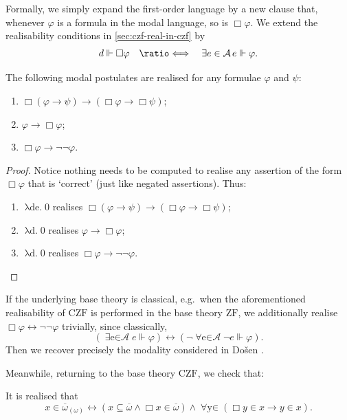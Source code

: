 \documentclass[12pt,openany]{book}
\theoremstyle{plain}
\theoremstyle{definition}
\newcommand\uplabel[1]{\textup{(#1)}}
\newcommand\opA[1]{\mathop{\forall #1}}
\newcommand\opE[1]{\mathop{\exists #1}}
\newcommand\oplam[1]{\mathop{\lambda #1.}}
\newcommand\defeqv{\quad \ratio\Longleftrightarrow \quad}
\newcommand\CZF{\mathrm{CZF}}
\newcommand\ZF{\mathrm{ZF}}
\begin{document}
Formally, we simply expand the first-order language by a new clause that, whenever $\varphi$ is a formula in the modal language, so is $\Box \varphi$. We extend the realisability conditions in \autoref{sec:czf-real-in-czf} by
\[d \Vdash \Box \varphi \defeqv \opE{e \in \mathcal{A}} e \Vdash \varphi.\]

\begin{lemma}
  \label{lem:dn-modal-axioms}
  The following modal postulates are realised for any formulae $\varphi$ and $\psi$:
  \begin{enumerate}[label=\uplabel{\arabic*}]
    \item $\Box \left(\varphi \rightarrow \psi\right) \rightarrow \left(\Box \varphi \rightarrow \Box \psi\right)$;
    \item $\varphi \rightarrow \Box \varphi$;
    \item $\Box \varphi \rightarrow \neg \neg \varphi$.
  \end{enumerate}
\end{lemma}

\begin{proof}
  Notice nothing needs to be computed to realise any assertion of the form $\Box \varphi$ that is `correct' (just like negated assertions). Thus:
  \begin{enumerate}[label=\uplabel{\arabic*}]
    \item $\oplam{de} 0$ realises $\Box \left(\varphi \rightarrow \psi\right) \rightarrow \left(\Box \varphi \rightarrow \Box \psi\right)$;
    \item $\oplam{d} 0$ realises $\varphi \rightarrow \Box \varphi$;
    \item $\oplam{d} 0$ realises $\Box \varphi \rightarrow \neg \neg \varphi$. \qedhere
  \end{enumerate}
\end{proof}

If the underlying base theory is classical, e.g.\ when the aforementioned realisability of $\CZF$ is performed in the base theory $\ZF$, we additionally realise $\Box \varphi \leftrightarrow \neg \neg \varphi$ trivially, since classically,
\[\left(\opE{e \in \mathcal{A}} e \Vdash \varphi\right) \leftrightarrow \left(\neg\!\opA{e \in \mathcal{A}} \neg e \Vdash \varphi\right).\]
Then we recover precisely the modality considered in Do\v{s}en \cite{dosen84-intuitionistic-double-negation}.

Meanwhile, returning to the base theory $\CZF$, we check that:
\begin{proposition}
  \label{prop:exo-omega-def-by-box}
  It is realised that
  \[x \in \overline{\omega}_{(\omega)} \leftrightarrow \left(x \subseteq \overline{\omega} \land \Box x \in \overline{\omega}\right) \land \opA{y \in \overline{\omega}} \left(\Box y \in x \rightarrow y \in x\right).\]
\end{proposition}
\end{document}
